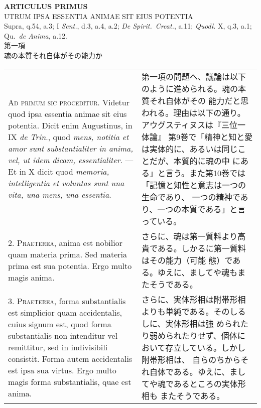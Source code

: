 \documentclass[paper=a4paper,fontsize=10pt,jafontsize=9pt,titlepage]{jlreq}
\begin{document}
\begin{center}
{\Large {\bfseries ARTICULUS PRIMUS}}\\
{\large UTRUM IPSA ESSENTIA ANIMAE SIT EIUS POTENTIA}\\
{\footnotesize Supra, q.54, a.3; I {\itshape Sent.}, d.3, a.4, a.2; {\itshape De Spirit.~Creat.}, a.11; {\itshape Quodl.} X, q.3, a.1; Qu.~{\itshape de Anima}, a.12.}\\
{\Large 第一項\\魂の本質それ自体がその能力か}
\end{center}

\begin{longtable}{p{21em}p{21em}}

{\scshape Ad primum sic proceditur}. Videtur quod ipsa essentia animae
sit eius potentia. Dicit enim Augustinus, in IX {\itshape de Trin}.,
quod {\itshape mens, notitia et amor sunt substantialiter in anima,
vel, ut idem dicam, essentialiter}. --- Et in X dicit quod {\itshape
memoria, intelligentia et voluntas sunt una vita, una mens, una
essentia}.

&

 第一項の問題へ、議論は以下のように進められる。魂の本質それ自体がその
 能力だと思われる。理由は以下の通り。アウグスティヌスは『三位一体論』
 第9巻で「精神と知と愛は実体的に、あるいは同じことだが、本質的に魂の中
 にある」と言う。また第10巻では「記憶と知性と意志は一つの生命であり、
 一つの精神であり、一つの本質である」と言っている。


\\

2. {\scshape Praeterea}, anima est nobilior quam materia prima. Sed
materia prima est sua potentia. Ergo multo magis anima.

&

 さらに、魂は第一質料より高貴である。しかるに第一質料はその能力（可能
 態）である。ゆえに、ましてや魂もまたそうである。

\\


3. {\scshape Praeterea}, forma substantialis est simplicior quam
accidentalis, cuius signum est, quod forma substantialis non
intenditur vel remittitur, sed in indivisibili consistit. Forma autem
accidentalis est ipsa sua virtus. Ergo multo magis forma
substantialis, quae est anima.

&

さらに、実体形相は附帯形相よりも単純である。そのしるしに、実体形相は強
められたり弱められたりせず、個体において存立している。しかし附帯形相は、
自らのちからそれ自体である。ゆえに、ましてや魂であるところの実体形相も
またそうである。


\end{longtable}
\end{document}
